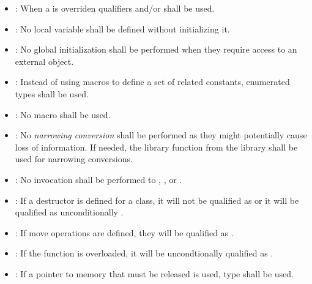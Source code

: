 \begin{itemize}
\item {}:
When a  is overriden qualifiers 
and/or  shall be used.

\item {}:
No local variable shall be defined without initializing it.

\item {}:
No global initialization shall be performed when they require access to
an external object.

\item {}:
Instead of using macros to define a set of related constants,
enumerated types shall be used.

\item {}:
No macro shall be used.

\item {}:
No \emph{narrowing conversion} shall be performed 
as they might potentially cause loss of information.
If needed, the library function  from the 
 library shall be used for narrowing conversions.

\item {}:
No invocation shall be performed to
, ,  or .

\item {}:
If a destructor is defined for a class, 
it will not be qualified as  
or it will be qualified as unconditionally .

\item {}:
If move operations are defined, they will be qualified as 
.

\item {}:
If the  function is overloaded,
it will be uncondtionally qualified as .

\item {}:
If a pointer to memory that must be released is used, 
type  shall be used.


\end{itemize}
